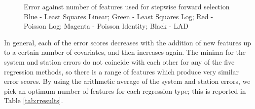 \documentclass[11pt]{report}
\begin{document}
\begin{figure}
\centering
{}
\captionsetup{singlelinecheck=off, font=scriptsize, justification=centering}
\caption[]{
Error against number of features used for stepwise forward selection\linebreak
Blue - Least Squares Linear; Green - Least Squares Log; Red - Poisson Log; Magenta - Poisson Identity; Black - LAD
}
\label{fig:bfscores}
\end{figure}

In general, each of the error scores decreases with the addition of new features up to a certain number of covariates, and then increases again. The minima for the system and station errors do not coincide with each other for any of the five regression methods, so there is a range of features which produce very similar error scores. By using the arithmetic average of the system and station errors, we pick an optimum number of features for each regression type; this is reported in Table \ref{tab:rresults}.  %
\end{document}
